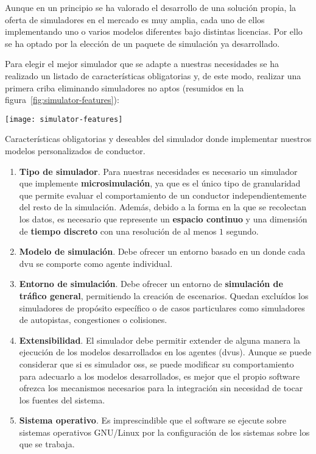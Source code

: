 Aunque en un principio se ha valorado el desarrollo de una solución propia, la oferta de simuladores en el mercado es muy amplia, cada uno de ellos implementando uno o varios modelos diferentes bajo distintas licencias. Por ello se ha optado por la elección de un paquete de simulación ya desarrollado.


Para elegir el mejor simulador que se adapte a nuestras necesidades se ha realizado un listado de características obligatorias y, de este modo, realizar una primera criba eliminando simuladores no aptos (resumidos en la figura~\ref{fig:simulator-features}):

\begin{marginfigure}
	\centering
	\texttt{[image: simulator-features]}
	\caption[Características obligatorias y deseables del simulador a elegir]{Características obligatorias y deseables del simulador donde implementar nuestros modelos personalizados de conductor.}
	\label{fig:simulator-features}
\end{marginfigure}

\begin{enumerate}
	\item \textbf{Tipo de simulador}. Para nuestras necesidades es necesario un simulador que implemente \textbf{microsimulación}, ya que es el único tipo de granularidad que permite evaluar el comportamiento de un conductor independientemente del resto de la simulación. Además, debido a la forma en la que se recolectan los datos, es necesario que represente un \textbf{espacio continuo} y una dimensión de \textbf{tiempo discreto} con una resolución de al menos $1$ segundo.
	\item \textbf{Modelo de simulación}. Debe ofrecer un entorno basado en un \textbf{} donde cada \gls{dvu} se comporte como agente individual.
	\item \textbf{Entorno de simulación}. Debe ofrecer un entorno de \textbf{simulación de tráfico general}, permitiendo la creación de escenarios. Quedan excluídos los simuladores de propósito específico o de casos particulares como simuladores de autopistas, congestiones o colisiones.
	\item \textbf{Extensibilidad}. El simulador debe permitir extender de alguna manera la ejecución de los modelos desarrollados en los agentes (\glspl{dvu}). Aunque se puede considerar que si es simulador \gls{oss}, se puede modificar su comportamiento para adecuarlo a los modelos desarrollados, es mejor que el propio software ofrezca los mecanismos necesarios para la integración sin necesidad de tocar los fuentes del sistema.
	\item \textbf{Sistema operativo}. Es imprescindible que el software se ejecute sobre sistemas operativos GNU/Linux por la configuración de los sistemas sobre los que se trabaja.
\end{enumerate}

